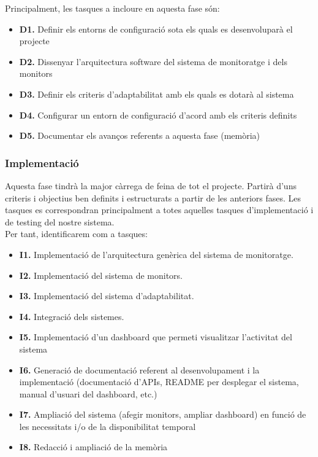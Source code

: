 Principalment, les tasques a incloure en aquesta fase són:

\begin{itemize}
\item \textbf{D1.} Definir els entorns de configuració sota els quals es desenvoluparà el projecte
\item \textbf{D2.} Dissenyar l’arquitectura software del sistema de monitoratge i dels monitors
\item \textbf{D3.} Definir els criteris d’adaptabilitat amb els quals es dotarà al sistema
\item \textbf{D4.} Configurar un entorn de configuració d’acord amb els criteris definits
\item \textbf{D5.} Documentar els avanços referents a aquesta fase (memòria)
\end{itemize}

\subsubsection{Implementació}

Aquesta fase tindrà la major càrrega de feina de tot el projecte. Partirà d’uns criteris i objectius ben definits i estructurats a partir de les anteriors fases. Les tasques es correspondran principalment a totes aquelles tasques d’implementació i de testing del nostre sistema. \\

Per tant, identificarem com a tasques:

\begin{itemize}
\item \textbf{I1.} Implementació de l’arquitectura genèrica del sistema de monitoratge.
\item \textbf{I2.} Implementació del sistema de monitors.
\item \textbf{I3.} Implementació del sistema d'adaptabilitat.
\item \textbf{I4.} Integració dels sistemes.
\item \textbf{I5.} Implementació d’un dashboard que permeti visualitzar l’activitat del sistema
\item \textbf{I6.} Generació de documentació referent al desenvolupament i la implementació (documentació d’APIs, README per desplegar el sistema, manual d’usuari del dashboard, etc.)
\item \textbf{I7.} Ampliació del sistema (afegir monitors, ampliar dashboard) en funció de les necessitats i/o de la disponibilitat temporal
\item \textbf{I8.} Redacció i ampliació de la memòria
\end{itemize}

